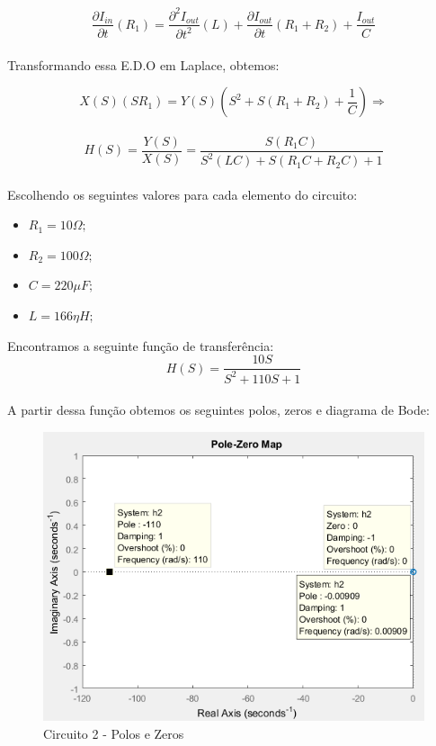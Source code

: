 \documentclass[a4paper, 12pt]{article}
\begin{document}
			\[
				\frac{\partial I_{in}}{\partial t}\left(R_{1}\right) = \frac{\partial^{2}I_{out}}{\partial t^{2}}\left(L\right) + \frac{\partial I_{out}}{\partial t}\left(R_{1} + R_{2}\right) + \frac{I_{out}}{C}
			\] 	\\

			Transformando essa E.D.O em Laplace, obtemos:

			\[
				X(S)\left(SR_{1}\right) = Y(S)\left(S^{2} + S\left(R_{1} +  R_{2}\right) + \frac{1}{C}\right) \Rightarrow
			\] 	\\
			\[
			H(S) = \frac{Y(S)}{X(S)} = \frac{S\left(R_{1}C\right)}{S^{2}\left(LC\right) + S\left(R_{1}C + R_{2}C\right) + 1}
			\] 	\\

			Escolhendo os seguintes valores para cada elemento do circuito:
			\begin{itemize}
				\item $R_{1} = 10\Omega;$
				\item $R_{2} = 100\Omega;$
				\item $C = 220\mu F;$
				\item $L = 166\eta H;$
			\end{itemize}

			Encontramos a seguinte função de transferência:
			\[
				H(S) = \frac{10S}{S^{2} + 110S + 1}
			\] 	\\
			A partir dessa função obtemos os seguintes polos, zeros e diagrama de Bode:
			\begin{figure}[!ht]
				\centering
				\includegraphics[scale=0.8]{img/1e_circ2.png}
				\caption{Circuito 2 - Polos e Zeros}
			\end{figure}
\end{document}
